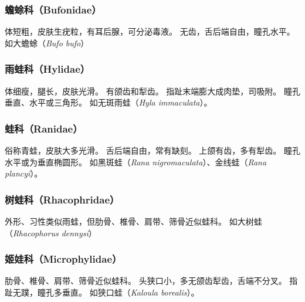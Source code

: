 \documentclass[11pt]{article}
\begin{document}
\subsubsection{蟾蜍科（Bufonidae）}
体短粗，皮肤生疣粒，有耳后腺，可分泌毒液。
无齿，舌后端自由，瞳孔水平。
如大蟾蜍（\textit{Bufo bufo}）

\subsubsection{雨蛙科（Hylidae）}
体细瘦，腿长，皮肤光滑。
有颌齿和犁齿。
指趾末端膨大成肉垫，司吸附。
瞳孔垂直、水平或三角形。
如无斑雨蛙（\textit{Hyla immaculata}）。

\subsubsection{蛙科（Ranidae）}
俗称青蛙，皮肤大多光滑。
舌后端自由，常有缺刻。
上颌有齿，多有犁齿。
瞳孔水平或为垂直椭圆形。
如黑斑蛙（\textit{Rana nigromaculata}）、金线蛙（\textit{Rana plancyi}）。

\subsubsection{树蛙科（Rhacophridae）}
外形、习性类似雨蛙，但肋骨、椎骨、肩带、筛骨近似蛙科。
如大树蛙（\textit{Rhacophorus dennysi}）

\subsubsection{姬娃科（Microphylidae）}
肋骨、椎骨、肩带、筛骨近似蛙科。
头狭口小，多无颌齿犁齿，舌端不分叉。
指趾无蹼，瞳孔多垂直。
如狭口蛙（\textit{Kaloula borealis}）。
\end{document}
